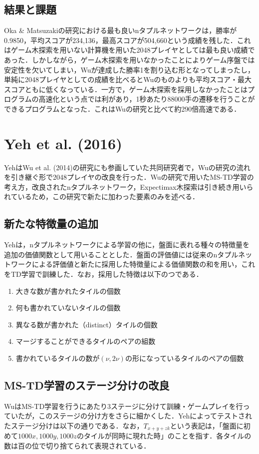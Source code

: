 \documentclass{suribt}
\begin{document}
\subsection{結果と課題}
Oka \& Matsuzakiの研究における最も良いnタプルネットワークは，勝率が0.9850，平均スコアが234,136，最高スコアが504,660という成績を残した．これはゲーム木探索を用いない計算機を用いた2048プレイヤとしては最も良い成績であった．しかしながら，ゲーム木探索を用いなかったことによりゲーム序盤では安定性を欠いてしまい，Wuが達成した勝率1を割り込む形となってしまったし，単純に2048プレイヤとしての成績を比べるとWuのものよりも平均スコア・最大スコアともに低くなっている．一方で，ゲーム木探索を採用しなかったことはプログラムの高速化という点では利があり，1秒あたり88000手の遷移を行うことができるプログラムとなった．これはWuの研究と比べて約290倍高速である．

\section{Yeh et al. (2016)}
YehはWu et al. (2014)の研究にも参画していた共同研究者で，Wuの研究の流れを引き継ぐ形で2048プレイヤの改良を行った．Wuの研究で用いたMS-TD学習の考え方，改良されたnタプルネットワーク，Expectimax木探索は引き続き用いられているため，この研究で新たに加わった要素のみを述べる．

\subsection{新たな特徴量の追加}
Yehは，nタプルネットワークによる学習の他に，盤面に表れる種々の特徴量を追加の価値関数として用いることとした．盤面の評価値には従来のnタプルネットワークによる評価値と新たに採用した特徴量による価値関数の和を用い，これをTD学習で訓練した．なお，採用した特徴は以下のつである．

\begin{enumerate}
\item 大きな数が書かれたタイルの個数
\item 何も書かれていないタイルの個数
\item 異なる数が書かれた（distinct）タイルの個数
\item マージすることができるタイルのペアの組数
\item 書かれているタイルの数が$({\nu}, 2{\nu})$の形になっているタイルのペアの個数
\end{enumerate}

\subsection{MS-TD学習のステージ分けの改良}
WuはMS-TD学習を行うにあたり3ステージに分けて訓練・ゲームプレイを行っていたが，このステージの分け方をさらに細かくした．Yehによってテストされたステージ分けは以下の通りである．なお，$T_{x+y+zk}$という表記は，「盤面に初めて$1000x, 1000y, 1000z$のタイルが同時に現れた時」のことを指す．各タイルの数は百の位で切り捨てられて表現されている．
\end{document}
